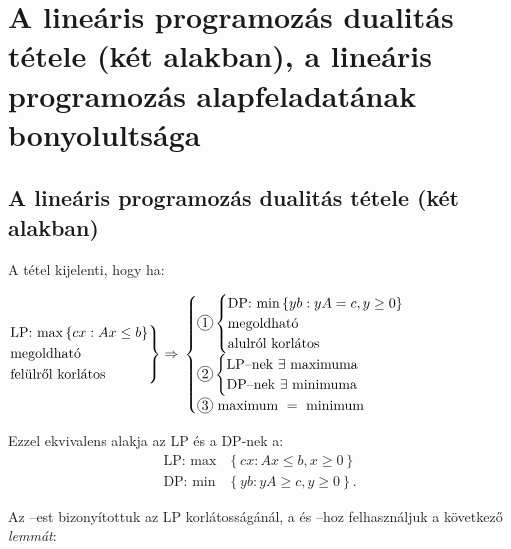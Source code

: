 \skiptooddpage
\section[A lineáris programozás dualitás tétele]{A lineáris programozás dualitás
  tétele (két alakban), a lineáris programozás alapfeladatának bonyolultsága}

\subsection{A lineáris programozás dualitás tétele (két alakban)}
A tétel kijelenti, hogy ha:

$ \begin{rcases}
		\mbox{LP: max}\left\{cx:Ax \leq b\right\} \\
		\mbox{megoldható}                         \\
		\mbox{felülről korlátos}
	\end{rcases} \Rightarrow$ $\begin{cases}
		\circled{1} \begin{cases}
			            \mbox{DP: min} \left\{ yb:yA = c, y \geq 0 \right\} \\
			            \mbox{megoldható}                                   \\
			            \mbox{alulról korlátos}
		            \end{cases} \\
		\circled{2} \begin{cases}
			            \mbox{LP--nek } \exists \mbox{ maximuma} \\
			            \mbox{DP--nek } \exists \mbox{ minimuma}
		            \end{cases}            \\
		\circled{3} \mbox{ maximum } = \mbox{ minimum}
	\end{cases}$

Ezzel ekvivalens alakja az LP és a DP-nek a:
\begin{align*}
	\mbox{LP: max} & \left\{ cx:Ax \leq b, x \geq 0 \right\}  \\
	\mbox{DP: min} & \left\{ yb:yA \geq c, y \geq 0 \right\}.
\end{align*}

Az --est bizonyítottuk az LP korlátosságánál, a  és
--hoz felhasználjuk a következő \emph{lemmát}:

